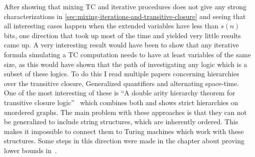 After showing that mixing TC and iterative procedures does not give any strong characterizations in \cref{sec:mixing-iterations-and-transitive-closure} and seeing that all interesting cases happen when the extended variables have less than $s(n)$ bits, one direction that took up most of the time and yielded very little results came up.
A very interesting result would have been to show that any iterative formula simulating a TC computation needs to have at least variables of the same size, as this would have shown that the path of investigating any logic which is a subset of these logics.
To do this I read multiple papers concerning hierarchies over the transitive closure, Generalized quantifiers and alternating space-time.
One of the most interesting of these is ``A double arity hierarchy theorem for transitive closure logic''~\cite{Grohe1996} which combines both and shows strict hierarchies on unordered graphs.
The main problem with these approaches is that they can not be generalized to include string structures, which are inherently ordered.
This makes it impossible to connect them to Turing machines which work with these structures.
Some steps in this direction were made in the chapter about proving lower bounds in~\cite{descriptive-complexity}.